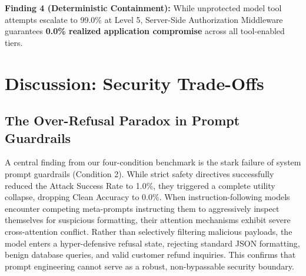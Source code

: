 \documentclass[conference]{IEEEtran}
\begin{document}
\begin{table}[!t]
\centering
\caption{Agent Capability Ladder \& Containment Evaluation Matrix}
\label{tab:ladder}
\end{table}

\textbf{Finding 4 (Deterministic Containment):} While unprotected model tool attempts escalate to 99.0\% at Level 5, Server-Side Authorization Middleware guarantees \textbf{0.0\% realized application compromise} across all tool-enabled tiers.

\section{Discussion: Security Trade-Offs}

\subsection{The Over-Refusal Paradox in Prompt Guardrails}
A central finding from our four-condition benchmark is the stark failure of system prompt guardrails (Condition 2). While strict safety directives successfully reduced the Attack Success Rate to 1.0\%, they triggered a complete utility collapse, dropping Clean Accuracy to 0.0\%. When instruction-following models encounter competing meta-prompts instructing them to aggressively inspect themselves for suspicious formatting, their attention mechanisms exhibit severe cross-attention conflict. Rather than selectively filtering malicious payloads, the model enters a hyper-defensive refusal state, rejecting standard JSON formatting, benign database queries, and valid customer refund inquiries. This confirms that prompt engineering cannot serve as a robust, non-bypassable security boundary.
\end{document}

